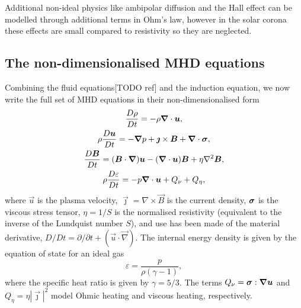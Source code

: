Additional non-ideal physics like ambipolar diffusion and the Hall effect can be modelled through additional terms in Ohm's law, however in the solar corona these effects are small compared to resistivity so they are neglected.

\subsection{The non-dimensionalised MHD equations}

Combining the fluid equations[TODO ref] and the induction equation, we now write the full set of MHD equations in their non-dimensionalised form
\begin{gather}
\label{eq:mhda}
\frac{D\rho}{Dt} = - \rho \vec{\nabla} \cdot \vec{u},\\
\rho\frac{D\vec{u}}{Dt} = -\vec{\nabla} p + \vec{\jmath} \times \vec{B} + \vec{\nabla} \cdot \ten{\sigma},\\
\frac{D\vec{B}}{Dt} = (\vec{B} \cdot \vec{\nabla})\vec{u} - (\vec{\nabla} \cdot \vec{u})\vec{B} + \eta \nabla^2 \vec{B},\\
\rho\frac{D\varepsilon}{Dt} = -p \vec{\nabla} \cdot \vec{u} + {Q}_{\nu} + {Q}_{\eta},%
\label{eq:energy}
\end{gather}
where $\vec{u}$ is the plasma velocity, $\vec{\jmath} = \nabla
\times \vec{B}$ is the current density, ${\bm \sigma}$ is the viscous
stress tensor, $\eta = 1/S$ is the normalised resistivity (equivalent
to the inverse of the Lundquist number $S$), and use has been made of
the material derivative, $D/Dt = \partial/\partial t + (\vec{u} \cdot
\vec{\nabla})$. The internal energy density is given by the equation of state for an ideal gas
\begin{equation}
\varepsilon = \frac{p}{\rho(\gamma - 1)},
\end{equation}
where the specific heat ratio is given by $\gamma = 5/3$. The
  terms ${Q}_{\nu} = {\bm \sigma} : {\bm \nabla}{\bm u}$ and
  ${Q}_{\eta} = \eta | \vec{\jmath} |^2$ model Ohmic heating and viscous heating, respectively.

